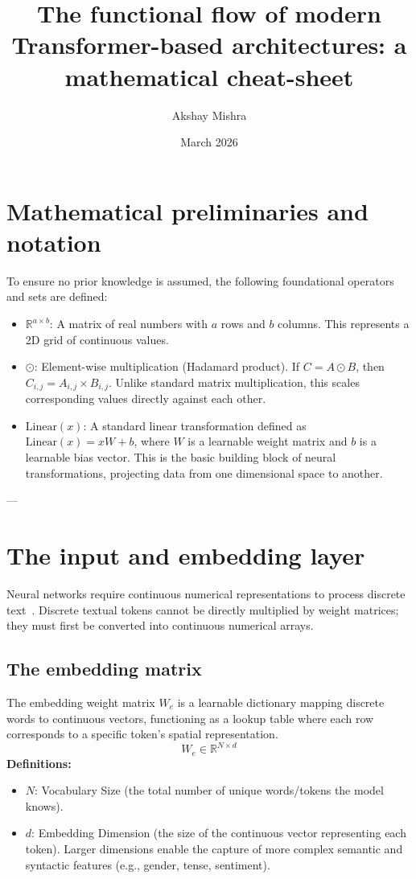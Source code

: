 \documentclass[11pt]{article}
\title{The functional flow of modern Transformer-based architectures: a mathematical cheat-sheet}
\author{Akshay Mishra}
\date{March 2026}
\begin{document}
	
	\maketitle
	
	\section{Mathematical preliminaries and notation}
	To ensure no prior knowledge is assumed, the following foundational operators and sets are defined:
	\begin{itemize}
		\item $\mathbb{R}^{a \times b}$: A matrix of real numbers with $a$ rows and $b$ columns.
		This represents a 2D grid of continuous values.
		\item $\odot$: Element-wise multiplication (Hadamard product).
		If $C = A \odot B$, then $C_{i,j} = A_{i,j} \times B_{i,j}$.
		Unlike standard matrix multiplication, this scales corresponding values directly against each other.
		\item $\text{Linear}(x)$: A standard linear transformation defined as $\text{Linear}(x) = xW + b$, where $W$ is a learnable weight matrix and $b$ is a learnable bias vector.
		This is the basic building block of neural transformations, projecting data from one dimensional space to another.
	\end{itemize}
	
	---
	
	\section{The input and embedding layer}
	Neural networks require continuous numerical representations to process discrete text~\cite{mikolov2013efficient}.
	Discrete textual tokens cannot be directly multiplied by weight matrices; they must first be converted into continuous numerical arrays.
	
	\subsection{The embedding matrix}
	The embedding weight matrix $W_e$ is a learnable dictionary mapping discrete words to continuous vectors,
	functioning as a lookup table where each row corresponds to a specific token's spatial representation.
	\begin{equation}
		W_e \in \mathbb{R}^{N \times d}
	\end{equation}
	\textbf{Definitions:} 
	\begin{itemize}
		\item $N$: Vocabulary Size (the total number of unique words/tokens the model knows).
		\item $d$: Embedding Dimension (the size of the continuous vector representing each token).
		Larger dimensions enable the capture of more complex semantic and syntactic features (e.g., gender, tense, sentiment).
	\end{itemize}
	
\end{document}
